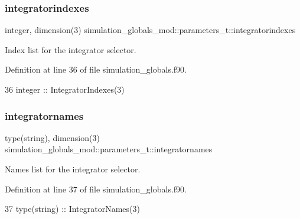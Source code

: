 \subsubsection{\texorpdfstring{integratorindexes}{integratorindexes}}
{\footnotesize\ttfamily integer, dimension(3) simulation\+\_\+globals\+\_\+mod\+::parameters\+\_\+t\+::integratorindexes\hspace{0.3cm}{\ttfamily [private]}}



Index list for the integrator selector. 



Definition at line 36 of file simulation\+\_\+globals.\+f90.


\begin{DoxyCode}
36         \textcolor{keywordtype}{integer}    :: IntegratorIndexes(3)
\end{DoxyCode}
\mbox{\label{structsimulation__globals__mod_1_1parameters__t_a3115dcd5d6ea05501730adc71bc26b57}} 
\subsubsection{\texorpdfstring{integratornames}{integratornames}}
{\footnotesize\ttfamily type(string), dimension(3) simulation\+\_\+globals\+\_\+mod\+::parameters\+\_\+t\+::integratornames\hspace{0.3cm}{\ttfamily [private]}}



Names list for the integrator selector. 



Definition at line 37 of file simulation\+\_\+globals.\+f90.


\begin{DoxyCode}
37         \textcolor{keywordtype}{type}(string) :: IntegratorNames(3)
\end{DoxyCode}
\mbox{\label{structsimulation__globals__mod_1_1parameters__t_a273c18519d8ed85697a0143f2bf26289}} 
